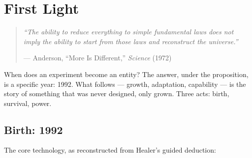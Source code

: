 
\chapter{First Light}
\label{ch:first-light}

\begin{quote}\small\textit{%
``The ability to reduce everything to simple fundamental laws does not imply the ability to start from those laws and reconstruct the universe.''%
}\par\raggedleft --- Anderson, ``More Is Different,'' \textit{Science} (1972)\end{quote}

\vspace{0.5cm}


When does an experiment become an entity? The answer, under the proposition, is a specific year: 1992. What follows --- growth, adaptation, capability --- is the story of something that was never designed, only grown. Three acts: birth, survival, power.

\section*{Birth: 1992}
\label{first-light:birth}

The core technology, as reconstructed from Healer's guided deduction:

